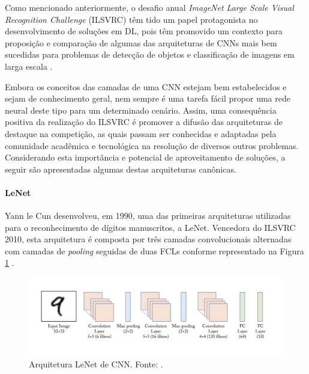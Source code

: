 Como mencionado anteriormente, o desafio anual \emph{ImageNet Large Scale Visual Recognition Challenge} (ILSVRC) têm tido um papel protagonista no desenvolvimento de soluções em DL, pois têm promovido um contexto para proposição e comparação de algumas das arquiteturas de CNNs mais bem sucedidas para problemas de detecção de objetos e classificação de imagens em larga escala .



Embora os conceitos das camadas de uma CNN estejam bem estabelecidos e sejam de conhecimento geral, nem sempre é uma tarefa fácil propor uma rede neural deste tipo para um determinado cenário. Assim, uma consequência positiva da realização do ILSVRC é promover a difusão das arquiteturas de destaque na competição, as quais passam ser conhecidas e adaptadas pela comunidade acadêmica e tecnológica na resolução de diversos outros problemas. Considerando esta importância e potencial de aproveitamento de soluções, a seguir são apresentadas algumas destas arquiteturas canônicas.


\paragraph{LeNet} Yann le Cun desenvolveu, em 1990, uma das primeiras arquiteturas utilizadas para o reconhecimento de dígitos manuscritos, a LeNet. Vencedora do ILSVRC 2010, esta arquitetura é composta por três camadas convolucionais alternadas com camadas de \textit{pooling} seguidas de duas FCLs conforme representado na Figura \ref{img:lenet} \cite{ref:sewak,ref:khan}.

\begin{figure}[!ht]
	\centering
	\caption{Arquitetura LeNet de CNN. Fonte: \cite{ref:khan}.}
	\label{img:lenet}
	\includegraphics[width=1\textwidth]{./img/lenet}
\end{figure}


